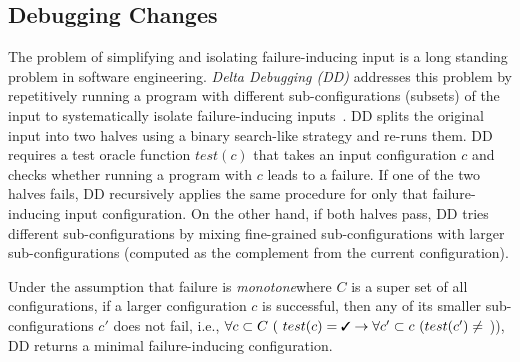 \subsection{Debugging Changes} 
\label{sec:deltadebugging} 
The problem of simplifying and isolating failure-inducing input is a long standing problem in software engineering. {\it Delta Debugging (DD)} addresses this problem by repetitively running a program with different sub-configurations (subsets) of the input to systematically isolate failure-inducing inputs~\cite{Zeller1999, zeller01}. DD splits the original input into two halves using a binary search-like strategy and re-runs them.  DD requires a test oracle function $test(c)$ that takes an input configuration $c$ and checks whether running a program with $c$ leads to a failure.  If one of the two halves fails, DD recursively applies the same procedure for only that failure-inducing input configuration. On the other hand, if both halves pass, DD tries different sub-configurations by mixing fine-grained sub-configurations with larger sub-configurations (computed as the complement from the current configuration). 

Under the assumption that failure is {\em monotone}\textemdash where $C$ is a super set of all configurations, if a larger configuration $c$ is successful, then any of its smaller sub-configurations $c'$ does not fail, i.e., $\forall c \subset C\ (\ test(c)=\text{\cmark} \rightarrow \forall c' \subset c \  (test(c') \neq$ )), DD returns a minimal failure-inducing configuration. %

